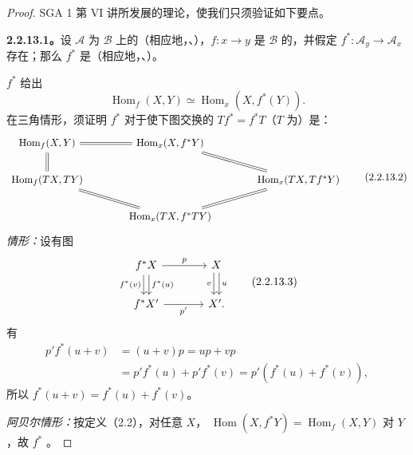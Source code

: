 \begin{proof}
SGA 1 第 VI 讲所发展的理论，使我们只须验证如下要点。

\textbf{2.2.13.1。}设 $\mathcal A$ 为 $\mathcal B$ 上的（相应地，、），$f:x\to y$ 是 $\mathcal B$ 的，并假定 $f^*:\mathcal A_y\to\mathcal A_x$ 存在；那么 $f^*$ 是（相应地，、）。

 $f^*$ 给出
\[
\operatorname{Hom}_f(X,Y)\simeq\operatorname{Hom}_x(X,f^*(Y)).
\]
在三角情形，须证明 $f^*$ 对于使下图交换的 $Tf^*=f^*T$（$T$ 为）是：
\[
\begin{tikzcd}[column sep=large]
\operatorname{Hom}_f(X,Y)\arrow[r,equal]\arrow[d,equal]&\operatorname{Hom}_x(X,f^*Y)\arrow[dr,equal]&\\
\operatorname{Hom}_f(TX,TY)\arrow[dr,equal]&&\operatorname{Hom}_x(TX,Tf^*Y)\\
&\operatorname{Hom}_x(TX,f^*TY)\arrow[ur,equal]&
\end{tikzcd}\tag{2.2.13.2}
\]
\emph{情形：}设有图
\[
\begin{tikzcd}[column sep=large]
f^*X\arrow[r,"p"]\arrow[d,shift left,"f^*(u)"]\arrow[d,shift right,"f^*(v)"']&X\arrow[d,shift left,"u"]\arrow[d,shift right,"v"']\\
f^*X'\arrow[r,"p'"']&X'.
\end{tikzcd}\tag{2.2.13.3}
\]
有
\[
\begin{aligned}
p'f^*(u+v)&=(u+v)p=up+vp\\
&=p'f^*(u)+p'f^*(v)=p'(f^*(u)+f^*(v)),
\end{aligned}
\]
所以 $f^*(u+v)=f^*(u)+f^*(v)$。

\emph{阿贝尔情形：}按定义（2.2），对任意 $X$， $\operatorname{Hom}(X,f^*Y)=\operatorname{Hom}_f(X,Y)$ 对 $Y$ ，故 $f^*$ 。


\end{proof}
